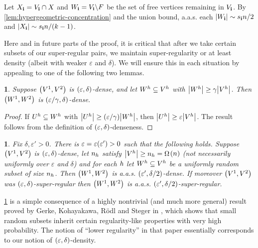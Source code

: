 \documentclass[11pt,english]{article}
\theoremstyle{plain}
\theoremstyle{plain}
\theoremstyle{plain}
\newtheorem{lem}[thm]{\protect\lemmaname}
\theoremstyle{plain}
\theoremstyle{plain}
\theoremstyle{definition}
\theoremstyle{definition}
\theoremstyle{remark}
\theoremstyle{remark}
\theoremstyle{plain}
\theoremstyle{definition}
\theoremstyle{definition}
\theoremstyle{plain}
\theoremstyle{plain}
\theoremstyle{plain}
\newtheorem{mylem}[mythm]{\protect\lemmaname}
\renewenvironment{lem}{\begin{mylem}}{\end{mylem}}
\theoremstyle{plain}
\theoremstyle{remark}
\theoremstyle{plain}
\theoremstyle{definition}
\let\originalleft\left
\let\originalright\right
\renewcommand{\left}{\mathopen{}\mathclose\bgroup\originalleft}
\renewcommand{\right}{\aftergroup\egroup\originalright}
\providecommand{\lemmaname}{Lemma}
\begin{document}
Let $X_{\mathbf{i}}=V_{\mathbf{i}}\cap X$ and $W_{\mathbf{i}}=V_{\mathbf{i}}\backslash F$ be
the set of free vertices remaining in $V_{\mathbf{i}}$. By \ref{lem:hypergeometric-concentration}
and the union bound, a.a.s. each $\left|W_{\bi}\right|\sim s_{\bi}n/2$
and $\left|X_{\bi}\right|\sim s_{\bi}n/\left(k-1\right)$.

Here and in future parts of the proof, it is critical that after we
take certain subsets of our super-regular pairs, we maintain super-regularity
or at least density (albeit with weaker $\varepsilon$ and $\delta$).
We will ensure this in each situation by appealing to one of the following
two lemmas.
\begin{lem}
\label{lem:large-preserves-dense}Suppose $\left(V^{1},V^{2}\right)$
is $\left(\varepsilon,\delta\right)$-dense, and let $W^{h}\subseteq V^{h}$
with $\left|W^{\h}\right|\ge\gamma\left|V^{\h}\right|$. Then $\left(W^{1},W^{2}\right)$
is $\left(\varepsilon/\gamma,\delta\right)$-dense.\end{lem}
\begin{proof}
If $U^{h}\subseteq W^{h}$ with $\left|U^{\h}\right|\ge\left(\varepsilon/\gamma\right)\left|W^{\h}\right|$,
then $\left|U^{\h}\right|\ge\varepsilon\left|V^{\h}\right|$. The
result follows from the definition of $\left(\varepsilon,\delta\right)$-denseness.\end{proof}
\begin{lem}
\label{lem:random-preserves-superregular}Fix $\delta,\varepsilon'>0$.
There is $\varepsilon=\varepsilon\left(\varepsilon'\right)>0$ such
that the following holds. Suppose $\left(V^{1},V^{2}\right)$ is $\left(\varepsilon,\delta\right)$-dense,
let $n_{h}$ satisfy $\left|V^{\h}\right|\ge n_{\h}=\Omega$$\left(n\right)$
(not necessarily uniformly over $\varepsilon$ and $\delta$) and
for each $h$ let $W^{h}\subseteq V^{h}$ be a uniformly random
subset of size $n_{h}$. Then $\left(W^{1},W^{2}\right)$ is a.a.s.
$\left(\varepsilon',\delta/2\right)$-dense. If moreover $\left(V^{1},V^{2}\right)$
was $\left(\varepsilon,\delta\right)$-super-regular then $\left(W^{1},W^{2}\right)$
is a.a.s. $\left(\varepsilon',\delta/2\right)$-super-regular.
\end{lem}
\ref{lem:random-preserves-superregular} is a simple consequence of
a highly nontrivial (and much more general) result proved by Gerke,
Kohayakawa, R\"odl and Steger in \cite{GKRS07}, which shows that
small random subsets inherit certain regularity-like properties with
very high probability. The notion of ``lower regularity'' in that
paper essentially corresponds to our notion of $\left(\varepsilon,\delta\right)$-density.
\end{document}
